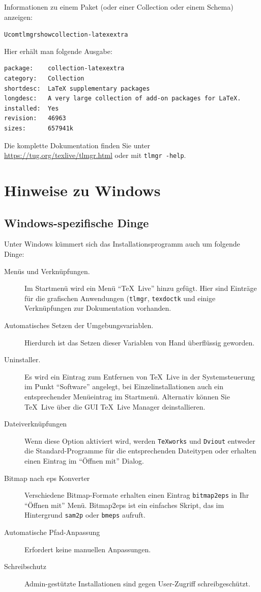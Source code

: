 \documentclass[12pt,ngerman,a4paper,fullparskip]{report}
\newcommand{\TL}{\TeX\ Live\xspace}
\newcommand{\cmdname}[1]{\texttt{#1}}
\newcommand{\prog}[1]{\texttt{#1}}
\begin{document}
Informationen zu einem Paket (oder einer Collection oder einem Schema) anzeigen:

\begin{alltt}
Ucom{tlmgr show collection-latexextra}
\end{alltt}

Hier erhält man folgende Ausgabe:

\begin{verbatim}
package:    collection-latexextra
category:   Collection
shortdesc:  LaTeX supplementary packages
longdesc:   A very large collection of add-on packages for LaTeX.
installed:  Yes
revision:   46963
sizes:      657941k
\end{verbatim}

\noindent Die komplette Dokumentation finden Sie unter \url{https://tug.org/texlive/tlmgr.html}
oder mit \texttt{tlmgr -help}.

\chapter{Hinweise zu Windows}
\label{sec:windows}


\section{Windows-spezifische Dinge}
\label{sec:winfeatures}

Unter Windows kümmert sich das Installationsprogramm auch um folgende Dinge:

\begin{description}
\item[Menüs und Verknüpfungen.] Im Startmenü wird ein Menü \enquote{\TL} hinzu gefügt. Hier sind Einträge für
  die grafischen Anwendungen (\prog{tlmgr}, \prog{texdoctk} 
  und einige Verknüpfungen zur Dokumentation vorhanden. 
\item[Automatisches Setzen der Umgebungsvariablen.] Hierdurch ist das Setzen dieser Variablen
  von Hand überflüssig geworden.
\item[Uninstaller.] Es wird ein Eintrag zum Entfernen von \TL in der Systemsteuerung im Punkt \enquote{Software} angelegt, bei Einzelinstallationen auch ein entsprechender Menüeintrag im Startmenü.
  Alternativ können Sie \TL über die GUI \TeX\ Live Manager deinstallieren.
\item[Dateiverknüpfungen] Wenn diese Option aktiviert wird, werden \prog{TeXworks} und \prog{Dviout}
  entweder die Standard-Programme für die entsprechenden Dateitypen oder erhalten einen Eintrag im \enquote{Öffnen mit} Dialog. \enlargethispage{1.5cm}
\item[Bitmap nach eps Konverter] Verschiedene Bitmap-Formate erhalten einen Eintrag \cmdname{bitmap2eps} in Ihr \enquote{Öffnen mit} Menü. Bitmap2eps ist ein einfaches Skript, das im Hintergrund \cmdname{sam2p} oder \cmdname{bmeps} aufruft. 
\item[Automatische Pfad-Anpassung] Erfordert keine manuellen Anpassungen.
\item[Schreibschutz] Admin-gestützte Installationen sind gegen User-Zugriff schreibgeschützt. 
\end{description}
\end{document}
